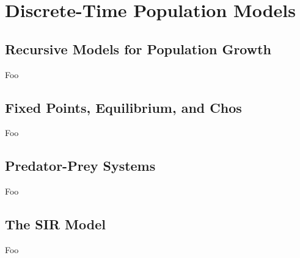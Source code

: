\section{Discrete-Time Population Models}

\subsection{Recursive Models for Population Growth}

Foo

\subsection{Fixed Points, Equilibrium, and Chos}

Foo

\subsection{Predator-Prey Systems}

Foo

\subsection{The SIR Model}

Foo


